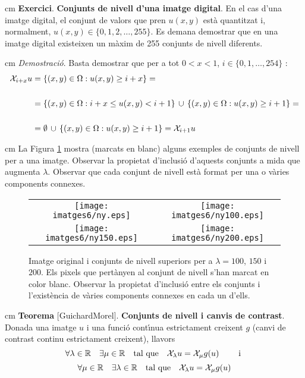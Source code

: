 \documentclass{article}
\def\R{\mathbb R}
\begin{document}
 cm
\noindent
{\bf Exercici}. {\bf Conjunts de nivell d'una imatge digital}.
En el cas d'una imatge digital, el conjunt de valors que pren $u(x, y)$ est\`a quantitzat i, normalment,
$u(x, y) \in \{0, 1, 2, \dots, 255\}$. Es demana demostrar que en una imatge digital existeixen un m\`axim de 
255 conjunts de nivell diferents.

 cm
\noindent
{\it Demostraci\'o}. 
Basta demostrar que per a tot $0 < x < 1$, $i \in \{ 0, 1, \dots, 254\}$ : 
\[
\begin{split}
{\cal X}_{i+x} u & = \{ (x, y) \in \Omega : u(x, y) \geq i+x \}= \\ \\
& = \{ (x, y) \in \Omega : i+x \leq u(x, y) < i+1 \} \, \cup \, \{ (x, y) \in \Omega : u(x, y) \geq i+1 \} = \\ \\
& = \emptyset \, \cup \, \{ (x, y) \in \Omega : u(x, y) \geq i+1 \} = {\cal X}_{i+1} u
\end{split}
\]

 cm
La Figura \ref{ex_levelsets} mostra (marcats en blanc) alguns exemples de conjunts de nivell per a una imatge. 
Observar la propietat d'inclusi\'o d'aquests conjunts a mida que augmenta $\lambda$. Observar que cada 
conjunt de nivell est\`a format per una o v\`aries components connexes.


\begin{figure}[htbp]
\begin{center}
\begin{tabular}{cc}
\texttt{[image: imatges6/ny.eps]} &
\texttt{[image: imatges6/ny100.eps]} \\
\texttt{[image: imatges6/ny150.eps]} &
\texttt{[image: imatges6/ny200.eps]}
\end{tabular}
\end{center}
\caption{Imatge original i conjunts de nivell superiors per a $\lambda=100$, $150$ i $200$. Els pixels que pert\`anyen
al conjunt de nivell s'han marcat en color blanc. Observar la propietat d'inclusi\'o entre els conjunts i 
l'exist\`encia de v\`aries components connexes en cada un d'ells.}
\label{ex_levelsets}
\end{figure}

 cm
\noindent
{\bf Teorema} [GuichardMorel]. {\bf Conjunts de nivell i canvis de contrast}. Donada una imatge $u$ i una funci\'o cont\'\i nua estrictament creixent $g$ (canvi de contrast continu estrictament creixent), llavors 
\[
\forall \lambda \in \R \quad \exists \mu \in \R \quad \text{tal que} \quad {\cal X}_\lambda u = {\cal X}_\mu g(u)
\qquad \text{ i }
\]
\[
\forall \mu \in \R \quad \exists \lambda \in \R \quad \text{tal que} \quad {\cal X}_\lambda u = {\cal X}_\mu g(u)
\]
\end{document}
